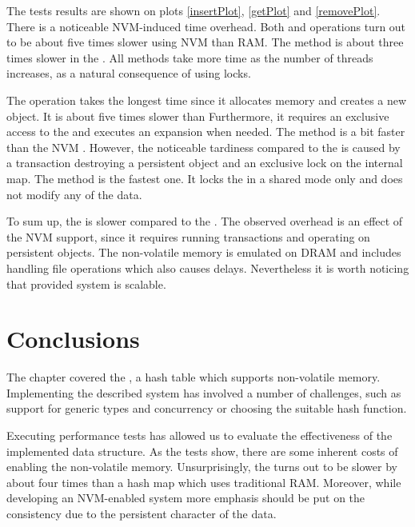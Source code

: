         The tests results are shown on plots \ref{insertPlot}, \ref{getPlot} and \ref{removePlot}. 
        There is a noticeable NVM-induced time overhead. 
        Both \insertMethod and \removeMethod operations turn out to be about five times slower using NVM than RAM. 
        The \getMethod method is about three times slower in the \NvmHashMap.
        All methods take more time as the number of threads increases, as a natural consequence of using locks.
        
        
        The \insertMethod operation takes the longest time since it allocates memory and creates a new object.
        It is about five times slower than
        Furthermore, it requires an exclusive access to the \internalHashMap and executes an expansion when needed. 
        The \removeMethod method is a bit faster than the NVM \insertMethod. 
        However, the noticeable tardiness compared to the \unorderedMap is caused by a transaction destroying a persistent object and an exclusive lock on the internal map.
        The \getMethod method is the fastest one. 
        It locks the \internalHashMap in a shared mode only and does not modify any of the data. 
        
        To sum up, the \NvmHashMap is slower compared to the \unorderedMap. 
        The observed overhead is an effect of the NVM support, since it requires running transactions and operating on persistent objects. 
        The non-volatile memory is emulated on DRAM and includes handling file operations which also causes delays.
        Nevertheless it is worth noticing that provided system is scalable.
        
\section{Conclusions}
    The chapter covered the \NvmHashMap, a hash table which supports non-volatile memory. Implementing the described system has involved a number of challenges, such as support for generic types and concurrency or choosing the suitable hash function. 
    
    Executing performance tests has allowed us to evaluate the effectiveness of the implemented data structure. 
    As the tests show, there are some inherent costs of enabling the non-volatile memory. 
    Unsurprisingly, the \NvmHashMap turns out to be slower by about four times than a hash map which uses traditional RAM. %
    Moreover, while developing an NVM-enabled system more emphasis should be put on the consistency due to the persistent character of the data.